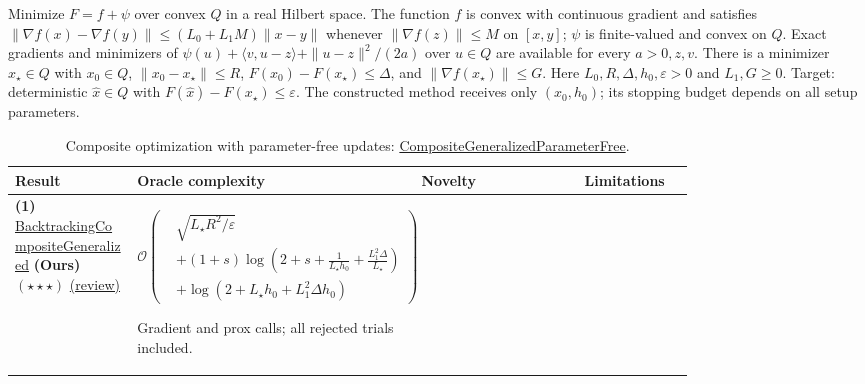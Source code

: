 \begin{table}[tp]
\centering
\caption{Composite optimization with parameter-free updates: \href{https://github.com/k3nfalt/longtails/blob/main/LongTails/Setups/CompositeGeneralizedParameterFree.lean}{CompositeGeneralizedParameterFree}.}\label{tab:CompositeGeneralizedParameterFree}
\parbox{\linewidth}{\footnotesize Minimize $F=f+\psi$ over convex $Q$ in a real Hilbert space. The function $f$ is convex with continuous gradient and satisfies $\|\nabla f(x)-\nabla f(y)\|\le (L_0+L_1M)\|x-y\|$ whenever $\|\nabla f(z)\|\le M$ on $[x,y]$; $\psi$ is finite-valued and convex on $Q$. Exact gradients and minimizers of $\psi(u)+\langle v,u-z\rangle+\|u-z\|^2/(2a)$ over $u\in Q$ are available for every $a>0,z,v$. There is a minimizer $x_\star\in Q$ with $x_0\in Q$, $\|x_0-x_\star\|\le R$, $F(x_0)-F(x_\star)\le\Delta$, and $\|\nabla f(x_\star)\|\le G$. Here $L_0,R,\Delta,h_0,\varepsilon>0$ and $L_1,G\ge0$. Target: deterministic $\widehat x\in Q$ with $F(\widehat x)-F(x_\star)\le\varepsilon$. The constructed method receives only $(x_0,h_0)$; its stopping budget depends on all setup parameters.}\par\smallskip
\begin{threeparttable}
\footnotesize
\setlength{\tabcolsep}{4pt}\renewcommand{\arraystretch}{1.25}
\begin{tabularx}{\linewidth}{@{}>{\raggedright\arraybackslash}p{0.18\linewidth}>{\raggedright\arraybackslash}p{0.37\linewidth}>{\raggedright\arraybackslash}p{0.24\linewidth}>{\raggedright\arraybackslash}X@{}}
\toprule
\textbf{Result} & \textbf{Oracle complexity} & \textbf{Novelty} & \textbf{Limitations} \\
\midrule
\textbf{(1)} \href{https://github.com/k3nfalt/longtails/blob/main/LongTails/Theorems/BacktrackingCompositeGeneralized.lean}{Backtracking\allowbreak Composite\allowbreak Generalized} \textbf{(Ours)} $(\star\star\star)$ \href{https://github.com/k3nfalt/longtails/blob/main/scripts/reviews/BacktrackingCompositeGeneralized.md}{(review)}
& $\displaystyle\mathcal{O}\!\left(\begin{aligned}
&\sqrt{L_\star R^2/\varepsilon}\\
&+(1+s)\log\!\left(2+s+\frac{1}{L_\star h_0}+\frac{L_1^2\Delta}{L_\star}\right)\\
&+\log(2+L_\star h_0+L_1^2\Delta h_0)
\end{aligned}\right)$\par Gradient and prox calls; all rejected trials included.
& & \\
\midrule[1.2pt]

\end{tabularx}
\end{threeparttable}
\end{table}
